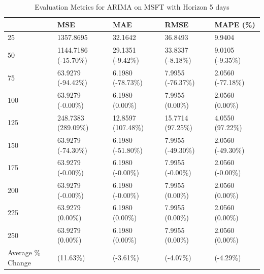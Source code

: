 \begin{table}
\caption{Evaluation Metrics for ARIMA on MSFT with Horizon 5 days}
\label{tab:arima_MSFT_h5_metrics}
\begin{tabular}{lllll}
\toprule
 & MSE & MAE & RMSE & MAPE (\%) \\
\midrule
25 & 1357.8695 & 32.1642 & 36.8493 & 9.9404 \\
50 & 1144.7186 (-15.70\%) & 29.1351 (-9.42\%) & 33.8337 (-8.18\%) & 9.0105 (-9.35\%) \\
75 & 63.9279 (-94.42\%) & 6.1980 (-78.73\%) & 7.9955 (-76.37\%) & 2.0560 (-77.18\%) \\
100 & 63.9279 (-0.00\%) & 6.1980 (0.00\%) & 7.9955 (0.00\%) & 2.0560 (0.00\%) \\
125 & 248.7383 (289.09\%) & 12.8597 (107.48\%) & 15.7714 (97.25\%) & 4.0550 (97.22\%) \\
150 & 63.9279 (-74.30\%) & 6.1980 (-51.80\%) & 7.9955 (-49.30\%) & 2.0560 (-49.30\%) \\
175 & 63.9279 (-0.00\%) & 6.1980 (-0.00\%) & 7.9955 (-0.00\%) & 2.0560 (-0.00\%) \\
200 & 63.9279 (-0.00\%) & 6.1980 (-0.00\%) & 7.9955 (0.00\%) & 2.0560 (0.00\%) \\
225 & 63.9279 (0.00\%) & 6.1980 (0.00\%) & 7.9955 (0.00\%) & 2.0560 (0.00\%) \\
250 & 63.9279 (0.00\%) & 6.1980 (0.00\%) & 7.9955 (0.00\%) & 2.0560 (0.00\%) \\
Average \% Change & (11.63\%) & (-3.61\%) & (-4.07\%) & (-4.29\%) \\
\bottomrule
\end{tabular}
\end{table}
